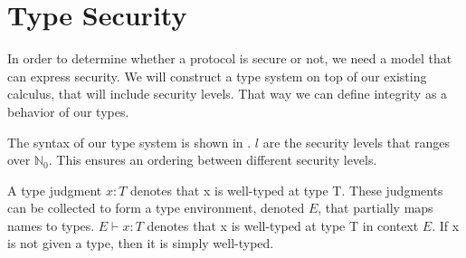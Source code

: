 \section{Type Security}
In order to determine whether a protocol is secure or not, we need a model that can express security.
We will construct a type system on top of our existing calculus, that will include security levels.
That way we can define integrity as a behavior of our types.


\noindent The syntax of our type system is shown in .
$l$ are the security levels that ranges over $\mathbb{N}_0$.
This ensures an ordering between different security levels.


\noindent A type judgment $x:T$ denotes that x is well-typed at type T.
These judgments can be collected to form a type environment, denoted $E$, that partially maps names to types.
$E\vdash x:T$ denotes that x is well-typed at type T in context $E$.
If x is not given a type, then it is simply well-typed.

